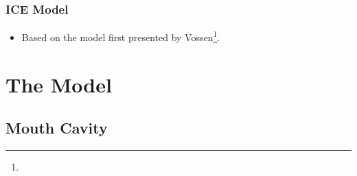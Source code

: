 \documentclass{beamer}
\begin{document}
\begin{frame}[t]
 \frametitle{ICE Model}
\begin{exampleblock}{}
 \begin{itemize}
  \item[] Based on the model first presented by Vossen\footnote{}.
 \end{itemize}

\end{exampleblock}

\end{frame}

\section{The Model}

\subsection{Mouth Cavity}
\end{document}
